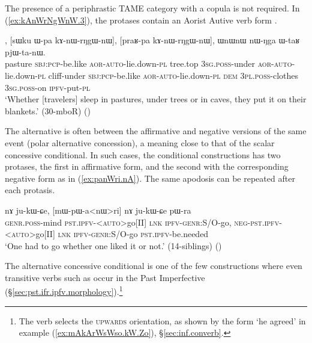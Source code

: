 The presence of a periphrastic TAME category with a copula is not required. In (\ref{ex:kAnWrNgWnW.3}), the protases contain an Aorist Autive verb form .

\begin{exe}
\ex \label{ex:kAnWrNgWnW.3}
, [sɯku ɯ-pa kɤ-nɯ-rŋgɯ-nɯ], [praʁ-pa kɤ-nɯ-rŋgɯ-nɯ], ɯnɯnɯ nɯ-ŋga ɯ-taʁ pjɯ-ta-nɯ. \\
pasture \textsc{sbj}:\textsc{pcp}-be.like \textsc{aor}-\textsc{auto}-lie.down-\textsc{pl} tree.top \textsc{3sg}.\textsc{poss}-under  \textsc{aor}-\textsc{auto}-lie.down-\textsc{pl} cliff-under \textsc{sbj}:\textsc{pcp}-be.like \textsc{aor}-\textsc{auto}-lie.down-\textsc{pl} \textsc{dem} \textsc{3pl}.\textsc{poss}-clothes \textsc{3sg}.\textsc{poss}-on \textsc{ipfv}-put-\textsc{pl} \\
\glt `Whether [travelers] sleep in pastures, under trees or in caves, they put it on their blankets.' (30-mboR)
()
\end{exe} 

The alternative is often between the affirmative and negative versions of the same event (polar alternative concession), a meaning close to that of the scalar concessive conditional. In such cases, the conditional constructions has two protases, the first in affirmative form, and the second with the corresponding negative form as in (\ref{ex:panWri.nA}). The same apodosis can be repeated after each protasis.
 

\begin{exe}
\ex \label{ex:panWri.nA}
\gll [tɯ-sɯm pɯ-a<nɯ>ri] nɤ ju-kɯ-ɕe, [mɯ-pɯ-a<nɯ>ri] nɤ ju-kɯ-ɕe pɯ-ra \\
\textsc{genr}.\textsc{poss}-mind \textsc{pst}.\textsc{ipfv}-<\textsc{auto}>go[II] \textsc{lnk} \textsc{ipfv}-\textsc{genr}:S/O-go, \textsc{neg}-\textsc{pst}.\textsc{ipfv}-<\textsc{auto}>go[II] \textsc{lnk} \textsc{ipfv}-\textsc{genr}:S/O-go \textsc{pst}.\textsc{ipfv}-be.needed \\
\glt `One had to go whether one liked it or not.' (14-siblings)
()
\end{exe} 
 
The alternative concessive conditional is one of the few constructions where even transitive verbs such as  occur in the Past Imperfective (§\ref{sec:pst.ifr.ipfv.morphology}).\footnote{The verb  selects the \textsc{upwards} orientation, as shown by the form  `he agreed' in example (\ref{ex:mAkArWsWso.kW.Zo}), §\ref{sec:inf.converb}. } 

